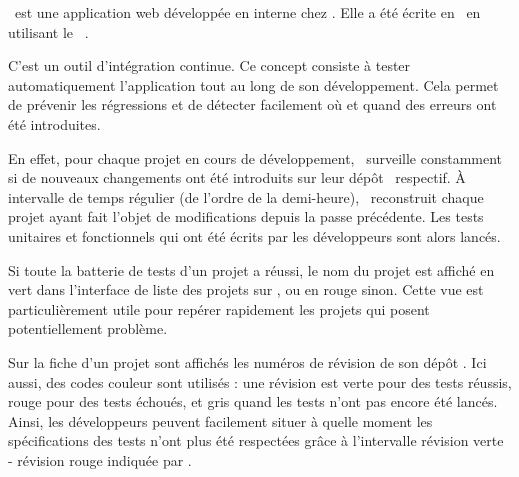 \asismo\ est une application web développée en interne chez \asl. Elle a été écrite en \aphp\ en utilisant le \afm\ \asf.

C'est un outil d'intégration continue. Ce concept consiste à tester automatiquement l'application tout au long de son développement. Cela permet de prévenir les régressions et de détecter facilement où et quand des erreurs ont été introduites.

En effet, pour chaque projet en cours de développement, \asismo\ surveille constamment si de nouveaux changements ont été introduits sur leur dépôt \asvn\ respectif. À intervalle de temps régulier (de l'ordre de la demi-heure), \asismo\ reconstruit chaque projet ayant fait l'objet de modifications depuis la passe précédente. Les tests unitaires et fonctionnels qui ont été écrits par les développeurs sont alors lancés.

Si toute la batterie de tests d'un projet a réussi, le nom du projet est affiché en vert dans l'interface de liste des projets sur \asismo, ou en rouge sinon. Cette vue est particulièrement utile pour repérer rapidement les projets qui posent potentiellement problème.

Sur la fiche d'un projet sont affichés les numéros de révision de son dépôt \asvn. Ici aussi, des codes couleur sont utilisés : une révision est verte pour des tests réussis, rouge pour des tests échoués, et gris quand les tests n'ont pas encore été lancés. Ainsi, les développeurs peuvent facilement situer à quelle moment les spécifications des tests n'ont plus été respectées grâce à l'intervalle révision verte - révision rouge indiquée par \asismo.

